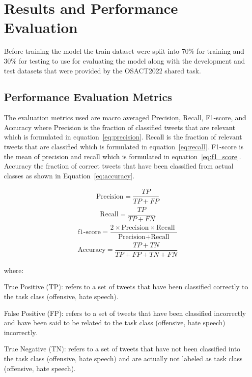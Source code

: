 \documentclass[10pt, a4paper]{article}
\begin{document}
\section{Results and Performance Evaluation}\label{sec:results_and_performance}
Before training the model the train dataset were split into 70\% for training and 30\% for testing to use for evaluating the model along with the development and test datasets that were provided by the OSACT2022 shared task.


\subsection{Performance Evaluation Metrics}
The evaluation metrics used are macro averaged Precision, Recall, F1-score, and Accuracy where Precision is the fraction of classified tweets that are relevant which is formulated in equation~\ref{eq:precision}. Recall is the fraction of relevant tweets that are classified which is formulated in equation~\ref{eq:recall}. F1-score is the mean of precision and recall which is formulated in equation~\ref{eq:f1_score}. Accuracy the fraction of correct tweets that have been classified from actual classes as shown in Equation~\ref{eq:accuracy}.

\begin{align}\label{eq:precision}
	\text{Precision} = \dfrac{TP}{TP + FP}
\end{align}
\begin{align}\label{eq:recall}
	\text{Recall}=\dfrac{TP}{TP + FN}
\end{align}
\begin{align}\label{eq:f1_score}
	\text{f1-score}=\dfrac{2 \times \text{Precision} \times \text{Recall }}{\text{Precision} + \text{Recall} }
\end{align}
\begin{align}\label{eq:accuracy}
	\text{Accuracy} = \dfrac{TP + TN}{TP + FP + TN + FN}
\end{align}

where:


True Positive (TP): refers to a set of tweets that have been classified correctly to the task class (offensive, hate speech).


False Positive (FP): refers to a set of tweets that have been classified incorrectly and have been said to be related to the task class (offensive, hate speech) incorrectly.


True Negative (TN): refers to a set of tweets that have not been classified into the task class (offensive, hate speech) and are actually not labeled as task class (offensive, hate speech).
\end{document}
